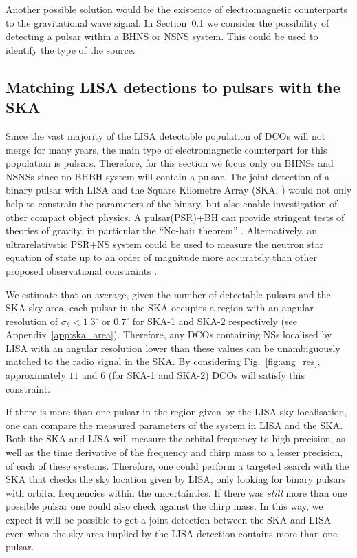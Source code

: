 Another possible solution would be the existence of electromagnetic counterparts to the gravitational wave signal. In Section~\ref{sec:pulsar_matching} we consider the possibility of detecting a pulsar within a BHNS or NSNS system. This could be used to identify the type of the source.

\subsection{Matching LISA detections to pulsars with the SKA}\label{sec:pulsar_matching}
Since the vast majority of the LISA detectable population of DCOs will not merge for many years, the main type of electromagnetic counterpart for this population is pulsars. Therefore, for this section we focus only on BHNSs and NSNSs since no BHBH system will contain a pulsar. The joint detection of a binary pulsar with LISA and the Square Kilometre Array (SKA, \citealt{Dewdney+2009}) would not only help to constrain the parameters of the binary, but also enable investigation of other compact object physics. A pulsar(PSR)+BH can provide stringent tests of theories of gravity, in particular the ``No-hair theorem'' \citep{Keane+2015}. Alternatively, an ultrarelativstic PSR+NS system could be used to measure the neutron star equation of state up to an order of magnitude more accurately than other proposed observational constraints \citep{Kyutoku+2019, Thrane+2020}.

We estimate that on average, given the number of detectable pulsars and the SKA sky area, each pulsar in the SKA occupies a region with an angular resolution of $\sigma_{\theta} < 1.3^\circ$ or $0.7^\circ$ for SKA-1 and SKA-2 respectively (see Appendix~\ref{app:ska_area}). Therefore, any DCOs containing NSs localised by LISA with an angular resolution lower than these values can be unambiguously matched to the radio signal in the SKA. By considering Fig.~\ref{fig:ang_res}, approximately $11$ and $6$ (for SKA-1 and SKA-2) DCOs will satisfy this constraint.

If there is more than one pulsar in the region given by the LISA sky localisation, one can compare the measured parameters of the system in LISA and the SKA. Both the SKA and LISA will measure the orbital frequency to high precision, as well as the time derivative of the frequency and chirp mass to a lesser precision, of each of these systems. Therefore, one could perform a targeted search with the SKA that checks the sky location given by LISA, only looking for binary pulsars with orbital frequencies within the uncertainties. If there was \textit{still} more than one possible pulsar one could also check against the chirp mass. In this way, we expect it will be possible to get a joint detection between the SKA and LISA even when the sky area implied by the LISA detection contains more than one pulsar.

